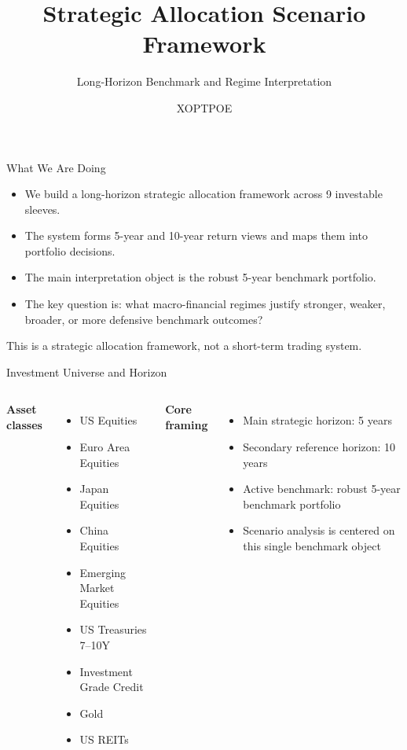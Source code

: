 \documentclass[aspectratio=169,11pt]{beamer}
\title{Strategic Allocation Scenario Framework}
\subtitle{Long-Horizon Benchmark and Regime Interpretation}
\author{XOPTPOE}
\date{}
\begin{document}
\begin{frame}
  \titlepage
\end{frame}

\begin{frame}{What We Are Doing}
\begin{itemize}
  \item We build a long-horizon strategic allocation framework across 9 investable sleeves.
  \item The system forms 5-year and 10-year return views and maps them into portfolio decisions.
  \item The main interpretation object is the robust 5-year benchmark portfolio.
  \item The key question is: what macro-financial regimes justify stronger, weaker, broader, or more defensive benchmark outcomes?
\end{itemize}
\vspace{0.6em}
{\small\color{muted}This is a strategic allocation framework, not a short-term trading system.}
\end{frame}

\begin{frame}{Investment Universe and Horizon}
\begin{columns}[T,totalwidth=\textwidth]
\textbf{Asset classes}
\begin{itemize}
  \item US Equities
  \item Euro Area Equities
  \item Japan Equities
  \item China Equities
  \item Emerging Market Equities
  \item US Treasuries 7--10Y
  \item Investment Grade Credit
  \item Gold
  \item US REITs
\end{itemize}

\textbf{Core framing}
\begin{itemize}
  \item Main strategic horizon: 5 years
  \item Secondary reference horizon: 10 years
  \item Active benchmark: robust 5-year benchmark portfolio
  \item Scenario analysis is centered on this single benchmark object
\end{itemize}
\end{columns}
\end{frame}
\end{document}
